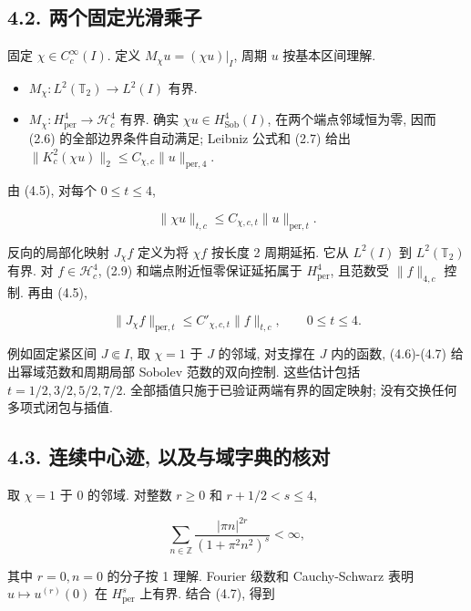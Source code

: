 \documentclass[UTF8,fontset=fandol,11pt,a4paper]{ctexart}
\begin{document}
\subsection*{4.2. 两个固定光滑乘子}

固定 \(\chi\in C_c^\infty(I)\). 定义 \(M_\chi u=(\chi u)|_I\), 周期 \(u\) 按基本区间理解.


\begin{itemize}

\item 
\(M_\chi:L^2(\mathbb T_2)\to L^2(I)\) 有界.



\item 
\(M_\chi:H_{\mathrm{per}}^4\to\mathcal H_c^4\) 有界. 确实 \(\chi u\in H_{\mathrm{Sob}}^4(I)\), 在两个端点邻域恒为零, 因而 (2.6) 的全部边界条件自动满足; Leibniz 公式和 (2.7) 给出 \(\|K_c^2(\chi u)\|_2\le C_{\chi,c}\|u\|_{\mathrm{per},4}\).



\end{itemize}

由 (4.5), 对每个 \(0\le t\le4\),


\[
 \boxed{\|\chi u\|_{t,c}\le C_{\chi,c,t}\|u\|_{\mathrm{per},t}.}
 \tag{4.6}
\]


反向的局部化映射 \(J_\chi f\) 定义为将 \(\chi f\) 按长度 2 周期延拓. 它从 \(L^2(I)\) 到 \(L^2(\mathbb T_2)\) 有界. 对 \(f\in\mathcal H_c^4\), (2.9) 和端点附近恒零保证延拓属于 \(H_{\mathrm{per}}^4\), 且范数受 \(\|f\|_{4,c}\) 控制. 再由 (4.5),


\[
 \boxed{\|J_\chi f\|_{\mathrm{per},t}\le C'_{\chi,c,t}\|f\|_{t,c},
 \qquad 0\le t\le4.}
 \tag{4.7}
\]


例如固定紧区间 \(J\Subset I\), 取 \(\chi=1\) 于 \(J\) 的邻域, 对支撑在 \(J\) 内的函数, (4.6)-(4.7) 给出幂域范数和周期局部 Sobolev 范数的双向控制. 这些估计包括 \(t=1/2,3/2,5/2,7/2\). 全部插值只施于已验证两端有界的固定映射; 没有交换任何多项式闭包与插值.


\subsection*{4.3. 连续中心迹, 以及与域字典的核对}

取 \(\chi=1\) 于 0 的邻域. 对整数 \(r\ge0\) 和 \(r+1/2<s\le4\),


\[
 \sum_{n\in\mathbb Z}\frac{|\pi n|^{2r}}{(1+\pi^2n^2)^s}<\infty,
 \tag{4.8}
\]


其中 \(r=0,n=0\) 的分子按 1 理解. Fourier 级数和 Cauchy-Schwarz 表明 \(u\mapsto u^{(r)}(0)\) 在 \(H_{\mathrm{per}}^s\) 上有界. 结合 (4.7), 得到
\end{document}
